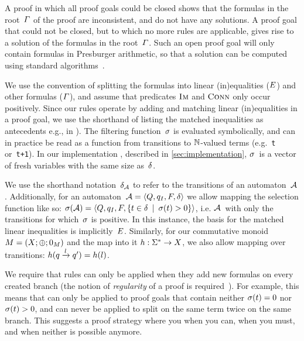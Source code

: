 \documentclass[acmsmall,review,anonymous,screen]{acmart}\settopmatter{printfolios=true,printccs=true,printacmref=true}
\theoremstyle{definition}
\begin{document}
A proof in which all proof goals could be closed shows that the formulas
in the root~$\varGamma$ of the proof are inconsistent, and do not
have any solutions. A proof goal that could not be closed, but to which no
more rules are applicable, gives rise to  a solution of the formulas in the
root~$\varGamma$. Such an open proof goal will only contain formulas
in Presburger arithmetic, so that a solution can be computed using
standard algorithms~\cite{Fitting96a}.

We use the convention of splitting the
formulas into linear (in)equalities ($E$)
and other formulas ($\varGamma$), and assume that predicates
$\operatorname{\textsc{Im}}$ and $\operatorname{\textsc{Conn}}$ only occur positively.
 Since
our rules operate by adding and matching linear (in)equalities in a proof goal,
we use the shorthand of listing the matched inequalities as antecedents
e.g., in \Propagate{}).
The filtering function~$\operatorname{\sigma}$ is evaluated symbolically, and can in practice
be read as a function from transitions to $\mathbb{N}$-valued terms
(e.g.~\texttt{t} or~\texttt{t+1}). In our implementation \Catra{}, described in
\cref{sec:implementation}, $\operatorname{\sigma}$~is a vector of fresh variables with the
same size as~$\delta$.

We use the shorthand notation~$\delta_{\mathcal{A}}$ to refer to the
transitions of an automaton~$\mathcal{A}$. Additionally, for an
automaton~$\mathcal{A} = \left\langle Q, q_I, F, \delta\right\rangle$ we allow mapping the selection function
like so: $\operatorname{\sigma}(\mathcal{A}) = \left\langle Q, q_I, F,
\left\{t \in \delta \:\mid\: \operatorname{\sigma}(t) > 0\right\}\right\rangle$, i.e.
$\mathcal{A}$~with only the transitions for which~$\operatorname{\sigma}$ is positive. In this
instance, the basis for the matched linear inequalities is
implicitly~$E$. Similarly, for our commutative monoid $M =
\left(X;\operatorname{\oplus};0_{M}\right)$ and the map into it $h : \Sigma^*
\rightarrow X$, we also allow mapping over transitions:
$h(q \xrightarrow{l} q') = h(l)$.

We require that rules can only be applied when they add new formulas
on every created branch (the notion of \emph{regularity} of a proof is
required~\cite{Fitting96a}). For example, this means that \Split{} can
only be applied to proof goals that contain neither
$\operatorname{\sigma}(t) = 0$ nor $\operatorname{\sigma}(t) > 0$, and can
never be applied to split on the same term twice on the same branch.
This suggests a proof strategy where you \Propagate{} when you can, \Split{}
when you must, and \Subsume{} when neither is possible anymore.
\end{document}
